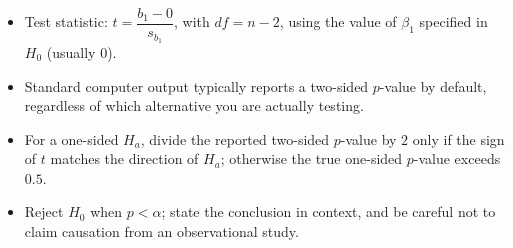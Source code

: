 \begin{itemize}
    \item Test statistic: $t = \dfrac{b_1 - 0}{s_{b_1}}$, with $df = n - 2$, using the value of $\beta_1$ specified in $H_0$ (usually $0$).
    \item Standard computer output typically reports a two-sided $p$-value by default, regardless of which alternative you are actually testing.
    \item For a one-sided $H_a$, divide the reported two-sided $p$-value by $2$ only if the sign of $t$ matches the direction of $H_a$; otherwise the true one-sided $p$-value exceeds $0.5$.
    \item Reject $H_0$ when $p < \alpha$; state the conclusion in context, and be careful not to claim causation from an observational study.
\end{itemize}


